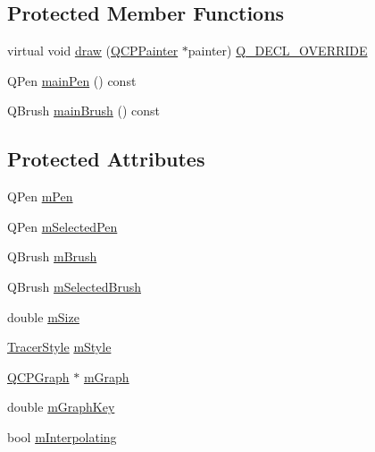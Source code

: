 \subsection*{Protected Member Functions}
\begin{DoxyCompactItemize}
\item 
virtual void \hyperlink{class_q_c_p_item_tracer_a11f187ffea436434f3b5cfc387811967}{draw} (\hyperlink{class_q_c_p_painter}{Q\+C\+P\+Painter} $\ast$painter) \hyperlink{qcustomplot_8h_a42cc5eaeb25b85f8b52d2a4b94c56f55}{Q\+\_\+\+D\+E\+C\+L\+\_\+\+O\+V\+E\+R\+R\+I\+DE}
\item 
Q\+Pen \hyperlink{class_q_c_p_item_tracer_abffdcf64d0f84f7b41bd4af07d144642}{main\+Pen} () const
\item 
Q\+Brush \hyperlink{class_q_c_p_item_tracer_a94f81c54197577e86c53a60cf39155cd}{main\+Brush} () const
\end{DoxyCompactItemize}
\subsection*{Protected Attributes}
\begin{DoxyCompactItemize}
\item 
Q\+Pen \hyperlink{class_q_c_p_item_tracer_a579e3bd6bd16d6aaff03638dc8a99a69}{m\+Pen}
\item 
Q\+Pen \hyperlink{class_q_c_p_item_tracer_a3f61829784200819661d1e2a5354d866}{m\+Selected\+Pen}
\item 
Q\+Brush \hyperlink{class_q_c_p_item_tracer_a6597be63a17a266233941354200b2340}{m\+Brush}
\item 
Q\+Brush \hyperlink{class_q_c_p_item_tracer_a1c15d2adde40efdcc0ef1ff78fd256a6}{m\+Selected\+Brush}
\item 
double \hyperlink{class_q_c_p_item_tracer_a575153a24bb357d1e006f6bc3bd099b9}{m\+Size}
\item 
\hyperlink{class_q_c_p_item_tracer_a2f05ddb13978036f902ca3ab47076500}{Tracer\+Style} \hyperlink{class_q_c_p_item_tracer_afb1f236bebf417544e0138fef22a292e}{m\+Style}
\item 
\hyperlink{class_q_c_p_graph}{Q\+C\+P\+Graph} $\ast$ \hyperlink{class_q_c_p_item_tracer_a2d70cf616b579563aa15f796dfc143ac}{m\+Graph}
\item 
double \hyperlink{class_q_c_p_item_tracer_a8fa20f2e9ee07d21fd7c8d30ba4702ca}{m\+Graph\+Key}
\item 
bool \hyperlink{class_q_c_p_item_tracer_afab37c22ad39f235921e86f93cd84595}{m\+Interpolating}
\end{DoxyCompactItemize}
